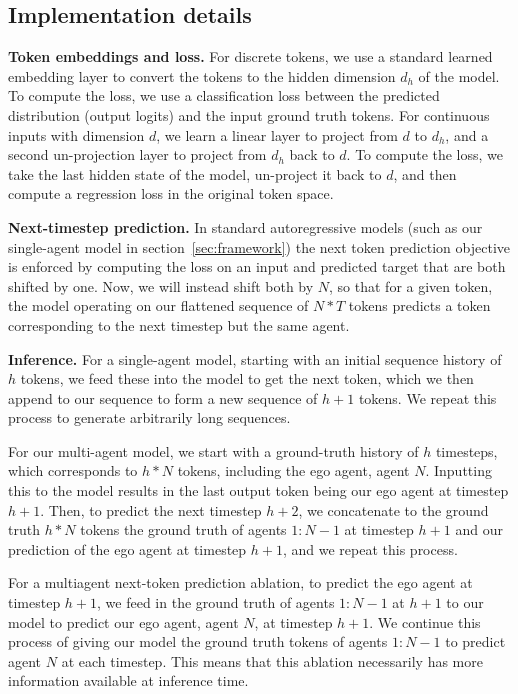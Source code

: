 \subsection{Implementation details}
\label{sec:par_impl_details}
\medskip \noindent \textbf{Token embeddings and loss.} For discrete tokens, we use a standard learned embedding layer to convert the tokens to the hidden dimension $d_{h}$ of the model. To compute the loss, we use a classification loss between the predicted distribution (output logits) and the input ground truth tokens. For continuous inputs with dimension $d$, we learn a linear layer to project from $d$ to $d_h$, and a second un-projection layer to project from $d_h$ back to $d$. To compute the loss, we take the last hidden state of the model, un-project it back to $d$, and then compute a regression loss in the original token space.

\medskip \noindent \textbf{Next-timestep prediction.} 
In standard autoregressive models (such as our single-agent model in section~\ref{sec:framework}) the next token prediction objective is enforced by computing the loss on an input and predicted target that are both shifted by one. Now, we will instead shift both by $N$, so that for a given token, the model operating on our flattened sequence of $N*T$ tokens predicts a token corresponding to the next timestep but the same agent.

\medskip \noindent \textbf{Inference.}
For a single-agent model, starting with an initial sequence history of $h$ tokens, we feed these into the model to get the next token, which we then append to our sequence to form a new sequence of $h+1$ tokens. We repeat this process to generate arbitrarily long sequences.

For our multi-agent model, we start with a ground-truth history of $h$ timesteps, which corresponds to $h*N$ tokens, including the ego agent, agent $N$. Inputting this to the model results in the last output token being our ego agent at timestep $h+1$. Then, to predict the next timestep $h+2$, we concatenate to the ground truth $h*N$ tokens the ground truth of agents $1:N-1$ at timestep $h+1$ and our prediction of the ego agent at timestep $h+1$, and we repeat this process.

For a multiagent next-token prediction ablation, to predict the ego agent at timestep $h+1$, we feed in the ground truth of agents $1:N-1$ at $h+1$ to our model to predict our ego agent, agent $N$, at timestep $h+1$. We continue this process of giving our model the ground truth tokens of agents $1:N-1$ to predict agent $N$ at each timestep. This means that this ablation necessarily has more information available at inference time.


